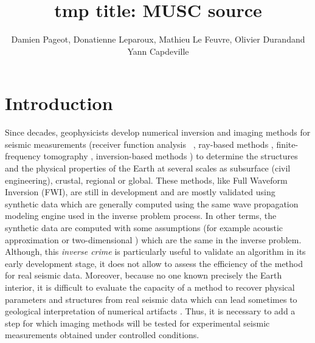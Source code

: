 \documentclass[manuscript,revised]{geophysics}
\newcommand{\twod}{two-dimensional }
\begin{document}
\title{tmp title: MUSC source}

\renewcommand{\thefootnote}{\fnsymbol{footnote}} 


\address{
\footnotemark[1]LUNAM-IFSTTAR, \\
\footnotemark[2]OSUNA \\
\footnotemark[1]LPGN, \\}
\author{Damien Pageot\footnotemark[1]\footnotemark[2], Donatienne Leparoux\footnotemark[1], Mathieu Le Feuvre\footnotemark[1], Olivier Durand\footnotemark[1] and Yann Capdeville\footnotemark[3]}


\maketitle

\begin{abstract}
\end{abstract}

\section{Introduction}

\noindent Since decades, geophysicists develop numerical inversion and imaging methods for seismic measurements (receiver function analysis  \citep{Ammon_1991_IRE}, ray-based methods \citep{Jones_PRM_2013}, finite-frequency tomography \citep{Montelli_FFT_2004}, inversion-based methods \citep{Virieux_FWI_2009}) to determine the structures and the physical properties of the Earth at several scales as subsurface (civil engineering), crustal, regional or global. These methods, like Full Waveform Inversion (FWI), are still in development and are mostly validated using synthetic data which are generally computed using the same wave propagation modeling engine used in the inverse problem process. In other terms, the synthetic data are computed with some assumptions (for example acoustic approximation or \twod) which are the same in the inverse problem. Although, this \textit{inverse crime} \citep{Wirgin_TIC_2004} is particularly useful to validate an algorithm in its early development stage, it does not allow to assess the efficiency of the method for real seismic data. Moreover, because no one known precisely the Earth interior, it is difficult to evaluate the capacity of a method to recover physical parameters and structures from real seismic data which can lead sometimes to geological interpretation of numerical artifacts \citep{Morozov_ARF_2004}. Thus, it is necessary to add a step for which imaging methods will be tested for experimental seismic measurements obtained under controlled conditions.      
\end{document}
